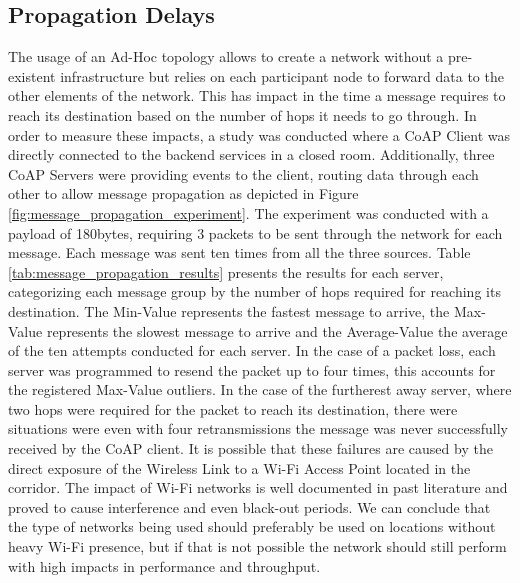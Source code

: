 \subsection{Propagation Delays}
The usage of an Ad-Hoc topology allows to create a network without a pre-existent infrastructure but relies on each participant node to forward data to the other elements of the network. This has impact in the time a message requires to reach its destination based on the number of hops it needs to go through. In order to measure these impacts, a study was conducted where a \gls{CoAP} Client was directly connected to the backend services in a closed room. Additionally, three \gls{CoAP} Servers were providing events to the client, routing data through each other to allow message propagation as depicted in Figure \ref{fig:message_propagation_experiment}. The experiment was conducted with a payload of 180bytes, requiring 3 packets to be sent through the network for each message. Each message was sent ten times from all the three sources. Table \ref{tab:message_propagation_results} presents the results for each server, categorizing each message group by the number of hops required for reaching its destination. The Min-Value represents the fastest message to arrive, the Max-Value represents the slowest message to arrive and the Average-Value the average of the ten attempts conducted for each server. In the case of a packet loss, each server was programmed to resend the packet up to four times, this accounts for the registered Max-Value outliers. In the case of the furtherest away server, where two hops were required for the packet to reach its destination, there were situations were even with four retransmissions the message was never successfully received by the \gls{CoAP} client. It is possible that these failures are caused by the direct exposure of the Wireless Link to a Wi-Fi Access Point located in the corridor. The impact of Wi-Fi networks is well documented in past literature \cite{Dong} and proved to cause interference and even black-out periods. We can conclude that the type of networks being used should preferably be used on locations without heavy Wi-Fi presence, but if that is not possible the network should still perform with high impacts in performance and throughput. 

